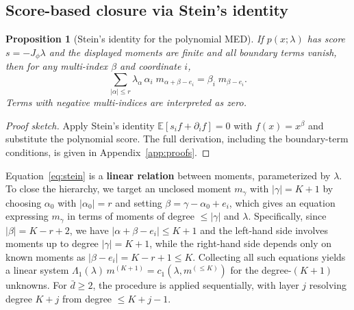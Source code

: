 \documentclass{article}
\newcommand{\E}{\mathbb{E}}
\newtheorem{proposition}{Proposition}
\theoremstyle{definition}
\begin{document}
\subsection{Score-based closure via Stein's identity}

\begin{proposition}[Stein's identity for the polynomial MED]\label{prop:stein}
If $p(x;\lambda)$ has score $s = -J_\phi\lambda$ and
the displayed moments are finite and all boundary terms vanish, then for any
multi-index $\beta$ and coordinate $i$,
\begin{equation}\label{eq:stein}
    \sum_{|\alpha| \le r} \lambda_\alpha\, \alpha_i\; m_{\alpha+\beta-e_i}
    = \beta_i\; m_{\beta-e_i}.
\end{equation}
Terms with negative multi-indices are interpreted as zero.
\end{proposition}

\begin{proof}[Proof sketch]
Apply Stein's identity $\E[s_i f + \partial_i f] = 0$
with $f(x) = x^\beta$ and substitute the polynomial score.
The full derivation, including the boundary-term conditions,
is given in Appendix~\ref{app:proofs}.
\end{proof}

Equation~\eqref{eq:stein} is a \textbf{linear relation} between moments,
parameterized by $\lambda$.
To close the hierarchy, we target an unclosed moment $m_\gamma$
with $|\gamma| = K + 1$ by choosing $\alpha_0$ with $|\alpha_0| = r$
and setting $\beta = \gamma - \alpha_0 + e_i$, which gives an equation expressing
$m_\gamma$ in terms of moments of degree $\le |\gamma|$ and $\lambda$.
Specifically, since $|\beta| = K - r + 2$, we have $|\alpha + \beta - e_i| \le K + 1$ and the left-hand side involves moments up to degree $|\gamma| = K + 1$, while the right-hand side depends only on known moments as $|\beta - e_i| = K - r + 1 \le K$.
Collecting all such equations yields a linear system
$\Lambda_1(\lambda)\, m^{(K+1)} = c_1(\lambda, m^{(\le K)})$
for the degree-$(K{+}1)$ unknowns.
For $\bar{d} \ge 2$, the procedure is applied sequentially, with
layer $j$ resolving degree $K{+}j$ from degree $\le K{+}j{-}1$.
\end{document}
